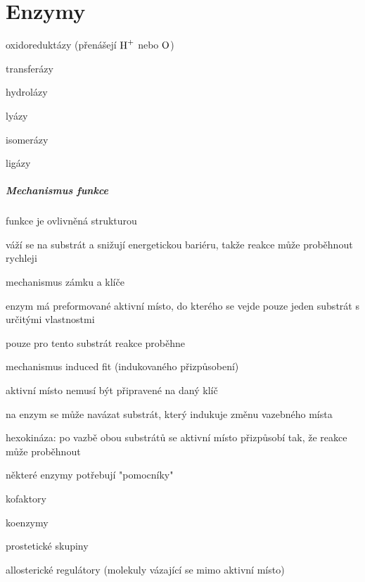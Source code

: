 \documentclass[DIV=8]{scrreprt}
\begin{document}
\chapter{Enzymy} \label{Enzymy}


\begin{myItemize}[nosep]
    \item oxidoreduktázy (přenášejí \(\ce{H+}\) nebo \(\ce{O}\))
    \item transferázy
    \item hydrolázy
    \item lyázy
    \item isomerázy
    \item ligázy
\end{myItemize}



\paragraph{Mechanismus funkce}
\begin{myItemize}[nosep]
    \item funkce je ovlivněná strukturou
    \item váží se na substrát a snižují energetickou bariéru, takže reakce může proběhnout rychleji
    \item mechanismus zámku a klíče
\begin{myItemize}[nosep]
    \item enzym má preformované aktivní místo, do kterého se vejde pouze jeden substrát s určitými vlastnostmi
    \item pouze pro tento substrát reakce proběhne
\end{myItemize}

    \item mechanismus induced fit (indukovaného přizpůsobení)
\begin{myItemize}[nosep]
    \item aktivní místo nemusí být připravené na daný klíč
    \item na enzym se může navázat substrát, který indukuje změnu vazebného místa
    \item hexokináza: po vazbě obou substrátů se aktivní místo přizpůsobí tak, že reakce může proběhnout
\end{myItemize}

    \item některé enzymy potřebují "pomocníky"
\begin{myItemize}[nosep]
    \item kofaktory
    \item koenzymy
    \item prostetické skupiny
    \item allosterické regulátory (molekuly vázající se mimo aktivní místo)
\end{myItemize}

\end{myItemize}
\end{document}
